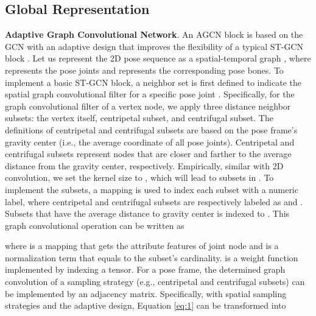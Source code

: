 \documentclass[10pt,twocolumn,letterpaper]{article}
\begin{document}
\subsection{Global Representation}
\noindent \textbf{Adaptive Graph Convolutional Network}.
An AGCN block \cite{li2018adaptive,RN027} is based on the GCN with an adaptive design that improves the flexibility of a typical ST-GCN block \cite{RN026}. 
Let us represent the 2D pose sequence  as a spatial-temporal graph , where  represents the pose joints and  represents the corresponding pose bones. To implement a basic ST-GCN block, a neighbor set  is first defined to indicate the spatial graph convolutional filter for a specific pose joint . Specifically, for the graph convolutional filter of a vertex node, we apply three distance neighbor subsets: the vertex itself, centripetal subset, and centrifugal subset. The definitions of centripetal and centrifugal subsets are based on the pose frame’s gravity center (i.e., the average coordinate of all pose joints). Centripetal and centrifugal subsets represent nodes that are closer and farther to the average distance from the gravity center, respectively. Empirically, similar with 2D convolution, we set the kernel size  to , which will lead to  subsets in . To implement the subsets, a mapping  is used to index each subset with a numeric label, where centripetal and centrifugal subsets are respectively labeled as  and . Subsets that have the average distance to gravity center is indexed to . This graph convolutional operation can be written as
\iffalse
\begin{figure}
	\begin{center}
		\texttt{[image: ./figs/gcn.pdf]}
	\end{center}
	\caption{Spatial sampling strategy of GCN. Different colors denote different subsets: green stars denote the vertex itself; yellow squares denote the farther centrifugal subset; blue circles denote the closer
centripetal subset.}
	\label{fig:graph_filters}
\end{figure}
\fi

where  is a mapping that gets the attribute features of joint node  and  is a normalization term that equals to the subset’s cardinality.  is a weight function  implemented by indexing a  tensor.
For a pose frame, the determined graph convolution of a sampling strategy (e.g., centripetal and centrifugal subsets) can be implemented by an  adjacency matrix. Specifically, with  spatial sampling strategies  and the adaptive design, Equation \ref{eq:1} can be transformed into
\end{document}
